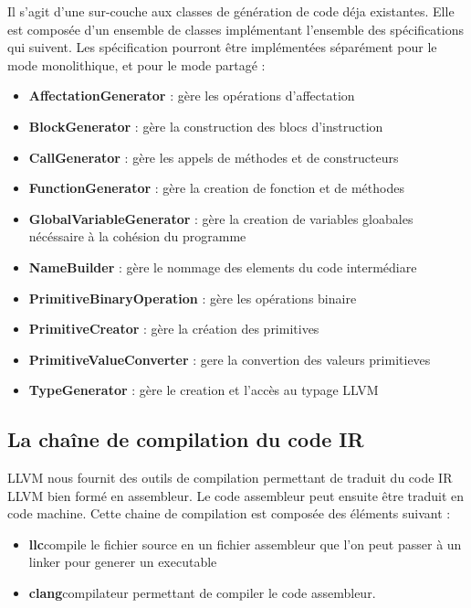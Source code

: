 \documentclass{report}
\begin{document}
Il s'agit d'une sur-couche aux classes de génération de code déja existantes. Elle est composée d'un ensemble de classes implémentant l'ensemble des spécifications qui suivent. Les spécification pourront être implémentées séparément pour le mode monolithique, et pour le mode partagé :
\begin{itemize}
\item \textbf{AffectationGenerator} : gère les opérations d'affectation
\item \textbf{BlockGenerator} : gère la construction des blocs d'instruction
\item \textbf{CallGenerator} : gère les appels de méthodes et de constructeurs
\item \textbf{FunctionGenerator} : gère la creation de fonction et de méthodes
\item \textbf{GlobalVariableGenerator} : gère la creation de variables gloabales nécéssaire à la cohésion du programme
\item \textbf{NameBuilder} : gère le nommage des elements du code intermédiare
\item \textbf{PrimitiveBinaryOperation} : gère les opérations binaire
\item \textbf{PrimitiveCreator} : gère la création des primitives
\item \textbf{PrimitiveValueConverter} : gere la convertion des valeurs primitieves
\item \textbf{TypeGenerator} : gère le creation et l'accès au typage LLVM

\end{itemize}

\subsection{La chaîne de compilation du code IR}

LLVM nous fournit des outils de compilation permettant de traduit du code IR LLVM bien formé
en assembleur. Le code assembleur peut ensuite être traduit en code machine.
Cette chaine de compilation est composée des éléments suivant :

\begin{itemize}
 \item \textbf{llc}compile le fichier source en un fichier assembleur que l'on peut passer à un linker pour generer un executable
 \item \textbf{clang}compilateur permettant de compiler le code assembleur.
\end{itemize}
\end{document}
